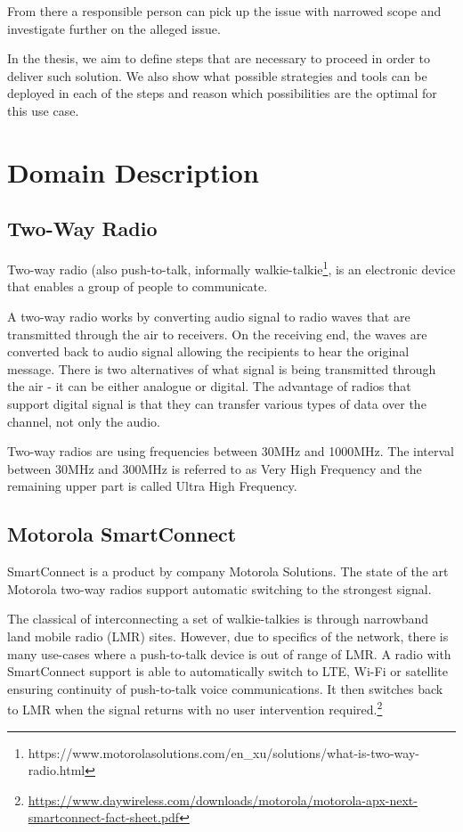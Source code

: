 From there a responsible person can pick up the issue with narrowed scope and investigate further on the alleged issue.

In the thesis, we aim to define steps that are necessary to proceed in order to deliver such solution. We also show what possible strategies and tools can be deployed in each of the steps and reason which possibilities are the optimal for this use case.

\section{Domain Description}

\subsection{Two-Way Radio}
Two-way radio (also push-to-talk, informally walkie-talkie\footnote{https://www.motorolasolutions.com/en\_xu/solutions/what-is-two-way-radio.html}, is an electronic device that enables a group of people to communicate.

A two-way radio works by converting audio signal to radio waves that are transmitted through the air to receivers. On the receiving end, the waves are converted back to audio signal allowing the recipients to hear the original message.
There is two alternatives of what signal is being transmitted through the air - it can be either analogue or digital.
The advantage of radios that support digital signal is that they can transfer various types of data over the channel, not only the audio.

Two-way radios are using frequencies between 30MHz and 1000MHz. The interval between 30MHz and 300MHz is referred to as Very High Frequency and the remaining upper part is called Ultra High Frequency.



\subsection{Motorola SmartConnect}

SmartConnect is a product by company Motorola Solutions. 
The state of the art Motorola two-way radios support automatic switching to the strongest signal.

The classical of interconnecting a set of walkie-talkies is through narrowband land mobile radio (LMR) sites. 
However, due to specifics of the network, there is many use-cases where a push-to-talk device is out of range of LMR. A radio with SmartConnect support is able to automatically switch to LTE, Wi-Fi or satellite ensuring continuity of push-to-talk voice communications. It then switches back to LMR when the signal returns with no user intervention required.\footnote{\url{https://www.daywireless.com/downloads/motorola/motorola-apx-next-smartconnect-fact-sheet.pdf}}


